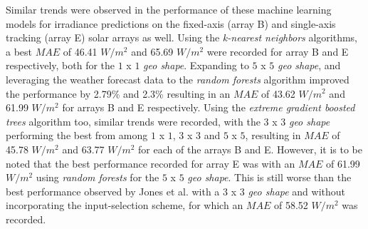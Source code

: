 \par Similar trends were observed in the performance of these machine learning models for irradiance predictions on the fixed-axis (array B) and single-axis tracking (array E) solar arrays as well. Using the \textit{k-nearest neighbors} algorithms, a best $MAE$ of 46.41 $W/m^2$ and 65.69 $W/m^2$ were recorded for array B and E respectively, both for the $1$ x $1$ \textit{geo shape}. Expanding to $5$ x $5$ \textit{geo shape}, and leveraging the weather forecast data to the \textit{random forests} algorithm improved the performance by 2.79\% and 2.3\% resulting in an $MAE$ of 43.62 $W/m^2$ and 61.99 $W/m^2$ for arrays B and E respectively. Using the \textit{extreme gradient boosted trees} algorithm too, similar trends were recorded, with the $3$ x $3$ \textit{geo shape} performing the best from among $1$ x $1$, $3$ x $3$ and $5$ x $5$, resulting in $MAE$ of 45.78 $W/m^2$ and 63.77 $W/m^2$ for each of the arrays B and E. However, it is to be noted that the best performance recorded for array E was with an $MAE$ of 61.99 $W/m^2$ using \textit{random forests} for the $5$ x $5$ \textit{geo shape}. This is still worse than the best performance observed by Jones et al. with a $3$ x $3$ \textit{geo shape} and without incorporating the input-selection scheme, for which an $MAE$ of 58.52 $W/m^2$ was recorded. 

